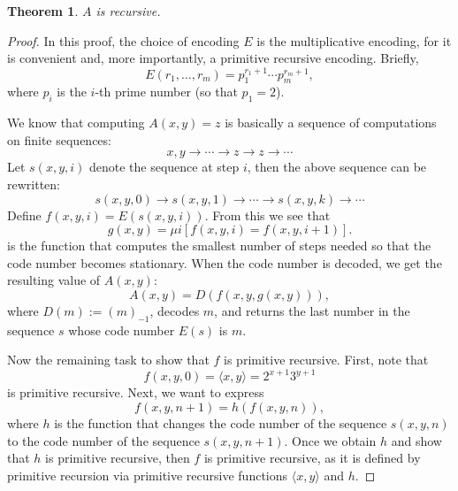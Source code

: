 \documentclass[12pt]{article}
\newtheorem{thm}{Theorem}
\begin{document}
\begin{thm} $A$ is recursive. \end{thm}
\begin{proof}  In this proof, the choice of encoding $E$ is the multiplicative encoding, for it is convenient and, more importantly, a primitive recursive encoding.  Briefly, $$E(r_1,\ldots, r_m)=p_1^{r_1+1}\cdots p_m^{r_m+1},$$ where $p_i$ is the $i$-th prime number (so that $p_1=2$).

We know that computing $A(x,y)=z$ is basically a sequence of computations on finite sequences:
$$x,y \longrightarrow \cdots \longrightarrow z \longrightarrow z \longrightarrow \cdots $$
Let $s(x,y,i)$ denote the sequence at step $i$, then the above sequence can be rewritten:
$$s(x,y,0) \longrightarrow s(x,y,1) \longrightarrow \cdots \longrightarrow s(x,y,k) \longrightarrow \cdots $$
Define $f(x,y,i)=E(s(x,y,i))$.  From this we see that 
$$g(x,y)=\mu i [f(x,y,i)=f(x,y,i+1)].$$
is the function that computes the smallest number of steps needed so that the code number becomes stationary.  When the code number is decoded, we get the resulting value of $A(x,y)$: $$A(x,y)=D(f(x,y,g(x,y))),$$
where $D(m):=(m)_{-1}$, decodes $m$, and returns the last number in the sequence $s$ whose code number $E(s)$ is $m$.

Now the remaining task to show that $f$ is primitive recursive.  First, note that $$f(x,y,0) = \langle x,y\rangle = 2^{x+1}3^{y+1}$$ is primitive recursive.  Next, we want to express $$f(x,y,n+1)=h(f(x,y,n)),$$ where $h$ is the function that changes the code number of the sequence $s(x,y,n)$ to the code number of the sequence $s(x,y,n+1)$.  Once we obtain $h$ and show that $h$ is primitive recursive, then $f$ is primitive recursive, as it is defined by primitive recursion via primitive recursive functions $\langle x,y\rangle$ and $h$.


\end{proof}
\end{document}
